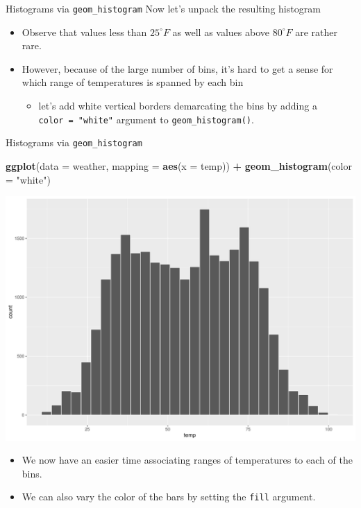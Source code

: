 \documentclass[
  ignorenonframetext,
]{beamer}
\newenvironment{Shaded}{\begin{snugshade}}{\end{snugshade}}
\newcommand{\AttributeTok}[1]{\textcolor[rgb]{0.13,0.29,0.53}{#1}}
\newcommand{\FunctionTok}[1]{\textcolor[rgb]{0.13,0.29,0.53}{\textbf{#1}}}
\newcommand{\NormalTok}[1]{#1}
\newcommand{\SpecialCharTok}[1]{\textcolor[rgb]{0.81,0.36,0.00}{\textbf{#1}}}
\newcommand{\StringTok}[1]{\textcolor[rgb]{0.31,0.60,0.02}{#1}}
\providecommand{\tightlist}{%
  \setlength{\itemsep}{0pt}\setlength{\parskip}{0pt}}
\begin{document}
\begin{frame}[fragile]{Histograms via \texttt{geom\_histogram}}
\protect\hypertarget{histograms-via-geom_histogram-1}{}
Now let's unpack the resulting histogram

\begin{itemize}
\item
  Observe that values less than \(25^{\circ}F\) as well as values above
  \(80^{\circ}F\) are rather rare.
\item
  However, because of the large number of bins, it's hard to get a sense
  for which range of temperatures is spanned by each bin

  \begin{itemize}
  \tightlist
  \item
    let's add white vertical borders demarcating the bins by adding a
    \texttt{color\ =\ "white"} argument to \texttt{geom\_histogram()}.
  \end{itemize}
\end{itemize}
\end{frame}

\begin{frame}[fragile]{Histograms via \texttt{geom\_histogram}}
\protect\hypertarget{histograms-via-geom_histogram-2}{}
\tiny

\begin{Shaded}
\begin{Highlighting}[]
\FunctionTok{ggplot}\NormalTok{(}\AttributeTok{data =}\NormalTok{ weather, }\AttributeTok{mapping =} \FunctionTok{aes}\NormalTok{(}\AttributeTok{x =}\NormalTok{ temp)) }\SpecialCharTok{+}
  \FunctionTok{geom\_histogram}\NormalTok{(}\AttributeTok{color =} \StringTok{"white"}\NormalTok{)}
\end{Highlighting}
\end{Shaded}

\begin{center}\includegraphics[width=0.7\linewidth,height=0.5\textheight]{Week2_Lect_files/figure-beamer/unnamed-chunk-27-1} \end{center}
\normalsize

\begin{itemize}
\item
  We now have an easier time associating ranges of temperatures to each
  of the bins.
\item
  We can also vary the color of the bars by setting the \texttt{fill}
  argument.
\end{itemize}
\end{frame}
\end{document}
